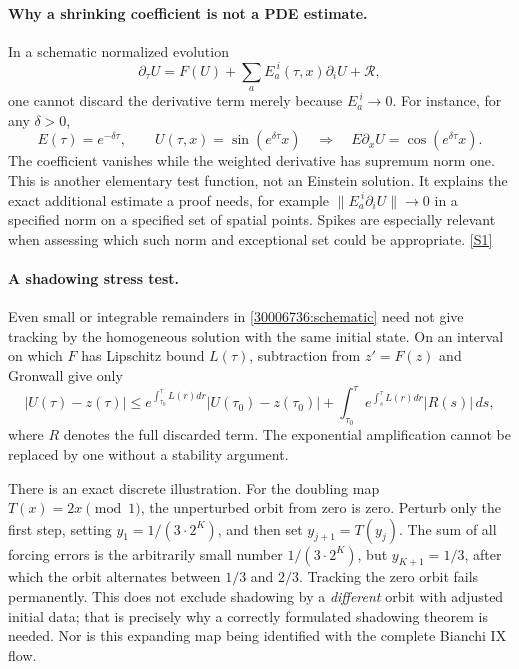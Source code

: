 \documentclass[11pt,a4paper]{article}
\newcommand{\sref}[2]{\hyperlink{source:#1:#2}{[S#2]}}
\numberwithin{equation}{section}
\begin{document}
\paragraph{Why a shrinking coefficient is not a PDE estimate.}
In a schematic normalized evolution
\begin{equation}\label{30006736:schematic}
 \partial_\tau U=F(U)+\sum_a E_a^{\ i}(\tau,x)\partial_iU+\mathcal R,
\end{equation}
one cannot discard the derivative term merely because $E_a^{\ i}\to0$.
For instance, for any $\delta>0$,
\[
 E(\tau)=e^{-\delta\tau},\qquad
 U(\tau,x)=\sin(e^{\delta\tau}x)
 \quad\Longrightarrow\quad
 E\partial_xU=\cos(e^{\delta\tau}x).
\]
The coefficient vanishes while the weighted derivative has supremum norm one.
This is another elementary test function, not an Einstein solution. It
explains the exact additional estimate a proof needs, for example
$\|E_a^{\ i}\partial_iU\|\to0$ in a specified norm on a specified set of spatial
points. Spikes are especially relevant when assessing which such norm and
exceptional set could be appropriate. \sref{30006736}{1}

\paragraph{A shadowing stress test.}
Even small or integrable remainders in \eqref{30006736:schematic} need not give
tracking by the homogeneous solution with the same initial state. On an
interval on which $F$ has Lipschitz bound $L(\tau)$, subtraction from
$z'=F(z)$ and Gronwall give only
\begin{equation}\label{30006736:gronwall}
 |U(\tau)-z(\tau)|\le
 e^{\int_{\tau_0}^\tau L(r)dr}|U(\tau_0)-z(\tau_0)|
 +\int_{\tau_0}^\tau e^{\int_s^\tau L(r)dr}|R(s)|\,ds,
\end{equation}
where $R$ denotes the full discarded term. The exponential amplification
cannot be replaced by one without a stability argument.

There is an exact discrete illustration. For the doubling map
$T(x)=2x\pmod1$, the unperturbed orbit from zero is zero. Perturb only the
first step, setting $y_1=1/(3\cdot2^K)$, and then set $y_{j+1}=T(y_j)$.
The sum of all forcing errors is the arbitrarily small number
$1/(3\cdot2^K)$, but $y_{K+1}=1/3$, after which the orbit alternates between
$1/3$ and $2/3$. Tracking the zero orbit fails permanently. This does not
exclude shadowing by a \emph{different} orbit with adjusted initial data;
that is precisely why a correctly formulated shadowing theorem is needed.
Nor is this expanding map being identified with the complete Bianchi IX
flow.
\end{document}

